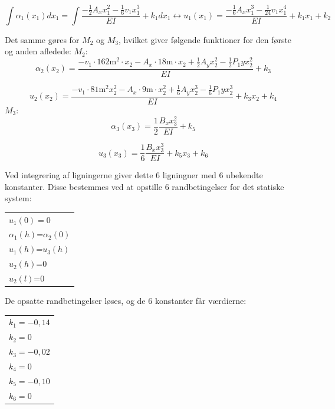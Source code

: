 \begin{equation}
	\int \alpha_1(x_1) dx_1 = \int \frac{-\frac{1}{2} A_x x_1^2 - \frac{1}{6} v_1 x_1^3}{EI} + k_1 dx_1 \leftrightarrow
	u_1(x_1) = \frac{-\frac{1}{6} A_x x_1^3 - \frac{1}{24} v_1x_1^4 }{EI} + k_1 x_1 + k_2
\end{equation}

Det samme gøres for $M_2$ og $M_3$, hvilket giver følgende funktioner for den første og anden afledede: 
\newline
\newline
$M_2$:
\begin{equation}
	\alpha_2(x_2) = \frac{-v_1 \cdot 162 \text{m}^2 \cdot x_2 - A_x \cdot 18 \text{m} \cdot x_2 + \frac{1}{2} A_y x_2^2 - \frac{1}{2}P_1y x_2^2}{EI} + k_3
\end{equation}
	
\begin{equation}
	u_2(x_2) = \frac{-v_1 \cdot 81 \text{m}^2 x_2^2 - A_x \cdot 9 \text{m} \cdot x_2^2 + \frac{1}{6} A_y x_2^3 - \frac{1}{6} P_1y x_2^3}{EI} + k_3 x_2 + k_4
\end{equation} 
\newline
\newline
$M_3$:
\begin{equation}
\alpha_3(x_3) = \frac{1}{2}\frac{B_x x_3^2}{EI} + k_5
\end{equation}

\begin{equation}
u_3(x_3) = \frac{1}{6} \frac{B_x x_3^3}{EI} + k_5 x_3 + k_6
\end{equation}

Ved integrering af ligningerne giver dette 6 ligningner med 6 ubekendte konstanter. Disse bestemmes ved at opstille 6 randbetingelser for det statiske system: 

\begin{table}[h]
	\begin{tabular}{l}
		$u_1(0)=0$       \\
		$\alpha_1(h)$=$\alpha_2(0)$ \\
		$u_1(h)$=$u_3(h)$ \\
		$u_2(h)$=0       \\
		$u_2(l)$=0       \\
	\end{tabular}
\end{table}

De opsatte randbetingelser løses, og de 6 konstanter får værdierne: 

\begin{table}[h]
	\begin{tabular}{l}
		$k_1 = -0,\!14$       \\
		$k_2 = 0$             \\
		$k_3 = -0,\!02$       \\
		$k_4 = 0$             \\
		$k_5 = -0,\!10$       \\
		$k_6 = 0$             \\ 
	\end{tabular}
\end{table}

